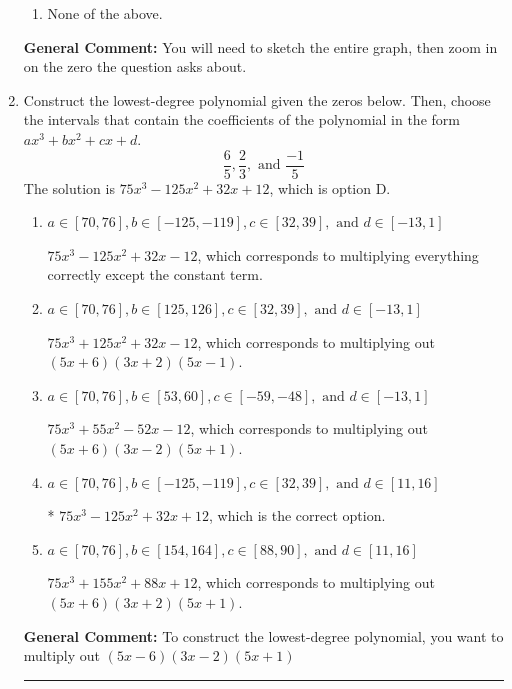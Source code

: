 \documentclass{extbook}[14pt]
\newcommand{\litem}[1]{\item #1

\rule{\textwidth}{0.4pt}}
\begin{document}
\begin{enumerate}
{\begin{enumerate}[label=\Alph*.]
\item None of the above.\end{enumerate}
\textbf{General Comment:} You will need to sketch the entire graph, then zoom in on the zero the question asks about.
}
\litem{
Construct the lowest-degree polynomial given the zeros below. Then, choose the intervals that contain the coefficients of the polynomial in the form $ax^3+bx^2+cx+d$.
\[ \frac{6}{5}, \frac{2}{3}, \text{ and } \frac{-1}{5} \]The solution is \( 75x^{3} -125 x^{2} +32 x + 12 \), which is option D.\begin{enumerate}[label=\Alph*.]
\item \( a \in [70, 76], b \in [-125, -119], c \in [32, 39], \text{ and } d \in [-13, 1] \)

$75x^{3} -125 x^{2} +32 x -12$, which corresponds to multiplying everything correctly except the constant term.
\item \( a \in [70, 76], b \in [125, 126], c \in [32, 39], \text{ and } d \in [-13, 1] \)

$75x^{3} +125 x^{2} +32 x -12$, which corresponds to multiplying out $(5x + 6)(3x + 2)(5x -1)$.
\item \( a \in [70, 76], b \in [53, 60], c \in [-59, -48], \text{ and } d \in [-13, 1] \)

$75x^{3} +55 x^{2} -52 x -12$, which corresponds to multiplying out $(5x + 6)(3x -2)(5x + 1)$.
\item \( a \in [70, 76], b \in [-125, -119], c \in [32, 39], \text{ and } d \in [11, 16] \)

* $75x^{3} -125 x^{2} +32 x + 12$, which is the correct option.
\item \( a \in [70, 76], b \in [154, 164], c \in [88, 90], \text{ and } d \in [11, 16] \)

$75x^{3} +155 x^{2} +88 x + 12$, which corresponds to multiplying out $(5x + 6)(3x + 2)(5x + 1)$.
\end{enumerate}

\textbf{General Comment:} To construct the lowest-degree polynomial, you want to multiply out $(5x -6)(3x -2)(5x + 1)$
}
\end{enumerate}
\end{document}
